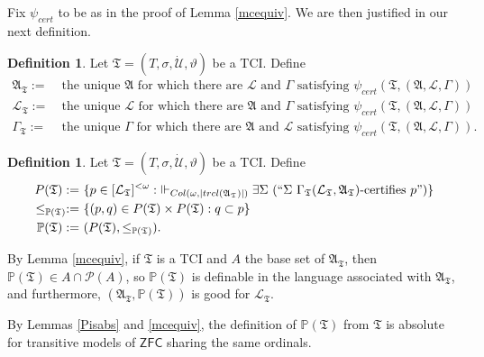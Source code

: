 \documentclass[12pt, twoside]{memoir}
\numberwithin{equation}{section}
\theoremstyle{definition}
\newtheorem{defi}[thm]{Definition}
\theoremstyle{remark}
\theoremstyle{definition}
\theoremstyle{definition}
\theoremstyle{definition}
\theoremstyle{remark}
\begin{document}
Fix $\psi_{cert}$ to be as in the proof of Lemma \ref{mcequiv}. We are then justified in our next definition.

\begin{defi}
Let $\mathfrak{T} = (T, \sigma, \dot{\mathcal{U}}, \vartheta)$ be a TCI. Define
\begin{align*}
    \mathfrak{A}_{\mathfrak{T}} := \ & \text{the unique } \mathfrak{A} \text{ for which there are } \mathcal{L} \text{ and } \Gamma \text{ satisfying } \psi_{cert}(\mathfrak{T}, (\mathfrak{A}, \mathcal{L}, \Gamma)) \\
    \mathcal{L}_{\mathfrak{T}} := \ & \text{the unique } \mathcal{L} \text{ for which there are } \mathfrak{A} \text{ and } \Gamma \text{ satisfying } \psi_{cert}(\mathfrak{T}, (\mathfrak{A}, \mathcal{L}, \Gamma)) \\
    \Gamma_{\mathfrak{T}} := \ & \text{the unique } \Gamma \text{ for which there are } \mathfrak{A} \text{ and } \mathcal{L} \text{ satisfying } \psi_{cert}(\mathfrak{T}, (\mathfrak{A}, \mathcal{L}, \Gamma)) \text{.}
\end{align*}
\end{defi}

\begin{defi}
Let $\mathfrak{T} = (T, \sigma, \dot{\mathcal{U}}, \vartheta)$ be a TCI. Define \begin{align*}
    P(\mathfrak{T}) := \ & \{p \in [\mathcal{L}_{\mathfrak{T}}]^{< \omega} : \ \Vdash_{Col(\omega, |trcl(\mathfrak{A}_{\mathfrak{T}})|)} \exists \Sigma \ (``\Sigma \ \Gamma_{\mathfrak{T}} (\mathcal{L}_{\mathfrak{T}}, \mathfrak{A}_{\mathfrak{T}})\text{-certifies } p")\} \\
    \leq_{\mathbb{P}(\mathfrak{T})} := \ & \{(p, q) \in P(\mathfrak{T}) \times P(\mathfrak{T}) : q \subset p\} \\
    \mathbb{P}(\mathfrak{T}) := \ & (P(\mathfrak{T}), \leq_{\mathbb{P}(\mathfrak{T})}) \text{.}
\end{align*}
\end{defi}

By Lemma \ref{mcequiv}, if $\mathfrak{T}$ is a TCI and $A$ the base set of $\mathfrak{A}_{\mathfrak{T}}$, then $\mathbb{P}(\mathfrak{T}) \in A \cap \mathcal{P}(A)$, so $\mathbb{P}(\mathfrak{T})$ is definable in the language associated with $\mathfrak{A}_{\mathfrak{T}}$, and furthermore, $(\mathfrak{A}_{\mathfrak{T}}, \mathbb{P}(\mathfrak{T}))$ is good for $\mathcal{L}_{\mathfrak{T}}$.

By Lemmas \ref{Pisabs} and \ref{mcequiv}, the definition of $\mathbb{P}(\mathfrak{T})$ from $\mathfrak{T}$ is absolute for transitive models of $\mathsf{ZFC}$ sharing the same ordinals.
\end{document}
